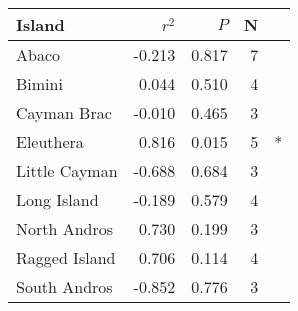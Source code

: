 
\begin{tabular}{lrrrl}
\toprule
Island & $r^2$ & $P$ & N & \\
\midrule
Abaco & -0.213 & 0.817 & 7 & \\
Bimini & 0.044 & 0.510 & 4 & \\
Cayman Brac & -0.010 & 0.465 & 3 & \\
Eleuthera & 0.816 & 0.015 & 5 & *\\
Little Cayman & -0.688 & 0.684 & 3 & \\
Long Island & -0.189 & 0.579 & 4 & \\
North Andros & 0.730 & 0.199 & 3 & \\
Ragged Island & 0.706 & 0.114 & 4 & \\
South Andros & -0.852 & 0.776 & 3 & \\
\bottomrule
\end{tabular}
